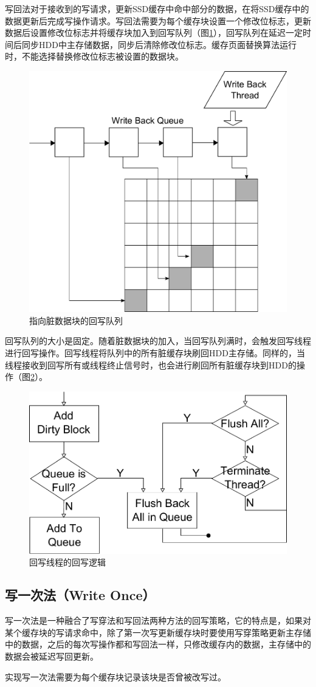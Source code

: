 写回法\cite{writeback2008}对于接收到的写请求，更新SSD缓存中命中部分的数据，在将SSD缓存中的数据更新后完成写操作请求。写回法需要为每个缓存块设置一个修改位标志，更新数据后设置修改位标志并将缓存块加入到回写队列（图\ref{fig:write-back-queue}），回写队列在延迟一定时间后同步HDD中主存储数据，同步后清除修改位标志。缓存页面替换算法运行时，不能选择替换修改位标志被设置的数据块。

\begin{figure}[H]
\centering
\includegraphics[width=0.4\linewidth]{./graph/write-back-queue}
\caption{指向脏数据块的回写队列}
\label{fig:write-back-queue}
\end{figure}

回写队列的大小是固定。随着脏数据块的加入，当回写队列满时，会触发回写线程进行回写操作。回写线程将队列中的所有脏缓存块刷回HDD主存储。同样的，当线程接收到回写所有或线程终止信号时，也会进行刷回所有脏缓存块到HDD的操作（图\ref{fig:write-back-thread}）。

\begin{figure}[H]
\centering
\includegraphics[width=0.6\linewidth]{./graph/write-back-thread}
\caption{回写线程的回写逻辑}
\label{fig:write-back-thread}
\end{figure}

\subsection{写一次法（Write Once）}
写一次法是一种融合了写穿法和写回法两种方法的回写策略，它的特点是，如果对某个缓存块的写请求命中，除了第一次写更新缓存块时要使用写穿策略更新主存储中的数据，之后的每次写操作都和写回法一样，只修改缓存内的数据，主存储中的数据会被延迟写回更新。

实现写一次法需要为每个缓存块记录该块是否曾被改写过。

